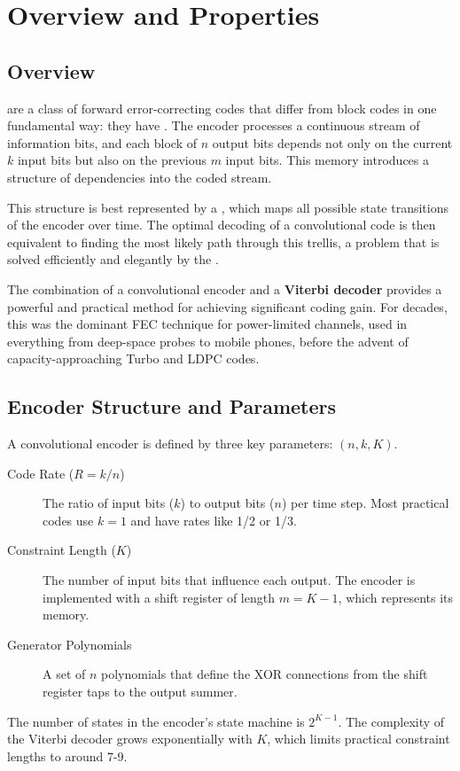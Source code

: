 \section{Overview and Properties}

\subsection{Overview}

 are a class of forward error-correcting codes that differ from block codes in one fundamental way: they have . The encoder processes a continuous stream of information bits, and each block of $n$ output bits depends not only on the current $k$ input bits but also on the previous $m$ input bits. This memory introduces a structure of dependencies into the coded stream.

This structure is best represented by a , which maps all possible state transitions of the encoder over time. The optimal decoding of a convolutional code is then equivalent to finding the most likely path through this trellis, a problem that is solved efficiently and elegantly by the .

\begin{keyconcept}
    The combination of a convolutional encoder and a \textbf{Viterbi decoder} provides a powerful and practical method for achieving significant coding gain. For decades, this was the dominant FEC technique for power-limited channels, used in everything from deep-space probes to mobile phones, before the advent of capacity-approaching Turbo and LDPC codes.
\end{keyconcept}


\subsection{Encoder Structure and Parameters}

A convolutional encoder is defined by three key parameters: $(n, k, K)$.
\begin{description}
    \item[Code Rate ($R=k/n$)] The ratio of input bits ($k$) to output bits ($n$) per time step. Most practical codes use $k=1$ and have rates like 1/2 or 1/3.
    \item[Constraint Length ($K$)] The number of input bits that influence each output. The encoder is implemented with a shift register of length $m=K-1$, which represents its memory.
    \item[Generator Polynomials] A set of $n$ polynomials that define the XOR connections from the shift register taps to the output summer.
\end{description}
The number of states in the encoder's state machine is $2^{K-1}$. The complexity of the Viterbi decoder grows exponentially with $K$, which limits practical constraint lengths to around 7-9.

